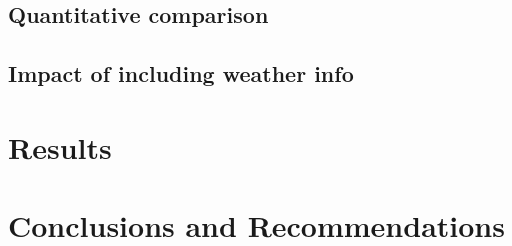 \documentclass[final,authoryear,5p,times,twocolumn, 12pt]{elsarticle}
\begin{document}
\subsection{Quantitative comparison}

\subsection{Impact of including weather info}

\section{Results}
\label{sec:results}

\section{Conclusions and Recommendations}
\label{sec:conclusion}




\end{document}
